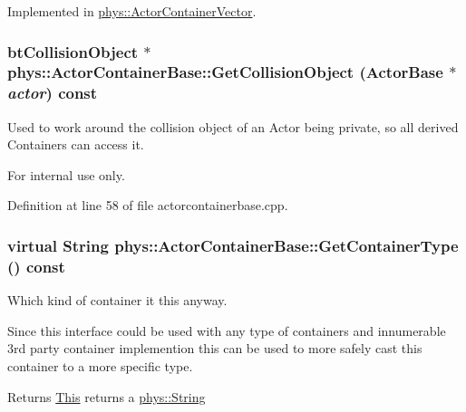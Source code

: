 Implemented in \hyperlink{classphys_1_1ActorContainerVector_a280700490b368a963dd8feae044c7a6d}{phys::ActorContainerVector}.

\hypertarget{classphys_1_1ActorContainerBase_a3f3d84f7775d2e8597290e214fedd5f9}{
\subsubsection[{GetCollisionObject}]{\setlength{\rightskip}{0pt plus 5cm}btCollisionObject $\ast$ phys::ActorContainerBase::GetCollisionObject ({\bf ActorBase} $\ast$ {\em actor}) const}}
\label{d1/d00/classphys_1_1ActorContainerBase_a3f3d84f7775d2e8597290e214fedd5f9}


Used to work around the collision object of an Actor being private, so all derived Containers can access it. 

\begin{DoxyInternal}{For internal use only.}
\end{DoxyInternal}


Definition at line 58 of file actorcontainerbase.cpp.

\hypertarget{classphys_1_1ActorContainerBase_a0ed43bc828aaee8ee33152970c3cc16d}{
\subsubsection[{GetContainerType}]{\setlength{\rightskip}{0pt plus 5cm}virtual {\bf String} phys::ActorContainerBase::GetContainerType () const}}
\label{d1/d00/classphys_1_1ActorContainerBase_a0ed43bc828aaee8ee33152970c3cc16d}


Which kind of container it this anyway. 

Since this interface could be used with any type of containers and innumerable 3rd party container implemention this can be used to more safely cast this container to a more specific type. \begin{DoxyReturn}{Returns}
\hyperlink{structThis}{This} returns a \hyperlink{namespacephys_aa03900411993de7fbfec4789bc1d392e}{phys::String} 
\end{DoxyReturn}


